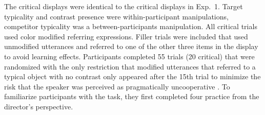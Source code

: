 \documentclass[10pt,letterpaper]{article}
\begin{document}
The critical displays were identical to the critical displays in Exp.~1.
Target typicality and contrast presence were within-participant manipulations, competitor typicality was a between-participants manipulation. All critical trials used color modified referring expressions. 
Filler trials were included that used unmodified utterances and referred to one of the other three items in the display to avoid learning effects. 
Participants completed 55 trials (20 critical) that were randomized with the only restriction that modified utterances that referred to a typical object with no contrast only appeared after the 15th trial to minimize the risk that the speaker was perceived as pragmatically uncooperative \cite{Grodner:2011}. To familiarize participants with the task, they first completed four practice from the director's perspective.
 
 




\end{document}
